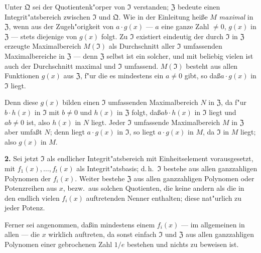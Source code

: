 Unter $\mathfrak{Q}$ sei der Quotientenk"orper von $\mathfrak{I}$ verstanden; $\mathfrak{Z}$ bedeute einen Integrit"atsbereich zwischen $\mathfrak{I}$ und $\mathfrak{Q}$. Wie in der Einleitung hei\ss e $M$ \textit{maximal} in $\mathfrak{Z}$, wenn aus der Zugeh"origkeit von $a \cdot g(x)$ --- $a$ eine ganze Zahl $\neq 0$, $g(x)$ in $\mathfrak{Z}$ --- stets diejenige von $g(x)$ folgt. Zu $\mathfrak{I}$ existiert eindeutig der durch $\mathfrak{I}$ in $\mathfrak{Z}$ erzeugte Maximalbereich $M(\mathfrak{I})$ als Durchschnitt aller $\mathfrak{I}$ umfassenden Maximalbereiche in $\mathfrak{Z}$ --- denn $\mathfrak{Z}$ selbst ist ein solcher, und mit beliebig vielen ist auch der Durchschnitt maximal und $\mathfrak{I}$ umfassend. $M(\mathfrak{I})$ besteht aus allen Funktionen $g(x)$ aus $\mathfrak{Z}$, f"ur die es mindestens ein $a \neq 0$ gibt, so da\ss $a \cdot g(x)$ in $\mathfrak{I}$ liegt.

Denn diese $g(x)$ bilden einen $\mathfrak{I}$ umfassenden Maximalbereich $N$ in $\mathfrak{Z}$, da f"ur $b \cdot h(x)$ in $\mathfrak{I}$ mit $b \neq 0$ und $h(x)$ in $\mathfrak{Z}$ folgt, da\ss $ab \cdot h(x)$ in $\mathfrak{I}$ liegt und $ab \neq 0$ ist, also $h(x)$ in $N$ liegt. Jeder $\mathfrak{I}$ umfassende Maximalbereich $M$ in $\mathfrak{Z}$ aber umfa\ss t $N$; denn liegt $a \cdot g(x)$ in $\mathfrak{I}$, so liegt $a \cdot g(x)$ in $M$, da $\mathfrak{I}$ in $M$ liegt; also $g(x)$ in $M$.

\medskip\noindent\textbf{2.}
Sei jetzt $\mathfrak{I}$ als endlicher Integrit"atsbereich mit Einheitselement vorausgesetzt, mit $f_1(x),\ldots,f_t(x)$ als Integrit"atsbasis; d.\,h.\ $\mathfrak{I}$ bestehe aus allen ganzzahligen Polynomen der $f_i(x)$. Weiter bestehe $\mathfrak{Z}$ aus allen ganzzahligen Polynomen oder Potenzreihen aus $x$, bezw.\ aus solchen Quotienten, die keine andern als die in den endlich vielen $f_i(x)$ auftretenden Nenner enthalten; diese nat"urlich zu jeder Potenz.

Ferner sei angenommen, da\ss in mindestens einem $f_i(x)$ --- im allgemeinen in allen --- die $x$ wirklich auftreten, da sonst einfach $\mathfrak{I}$ und $\mathfrak{Z}$ aus allen ganzzahligen Polynomen einer gebrochenen Zahl $1/e$ bestehen und nichts zu beweisen ist.

